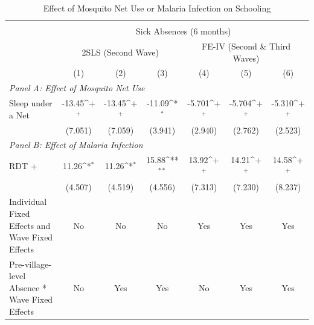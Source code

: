 \documentclass[fleqn,11pt]{article}
\newcommand{\sym}[1]{\rlap{$#1$}}
\def\sym#1{\ifmmode^{#1}\else\(^{#1}\)\fi
}
\begin{document}
\begin{table}[h]
\caption{Effect of Mosquito Net Use or Malaria Infection on Schooling}
\label{latemqnabsence62_child}\centering
\begin{adjustbox}{max width=\textwidth}
\begin{threeparttable}
\begin{tabular}{l*{6}{c}}
\hline\hline
                                                                \\
                                                                 &\multicolumn{6}{c}{Sick Absences (6 months)}\\  \cmidrule(lr){2-7}

                                       &\multicolumn{3}{c}{2SLS (Second Wave)}&\multicolumn{3}{c}{FE-IV (Second \& Third Waves)}\\  \cmidrule(lr){2-4}  \cmidrule(lr){5-7}
                    &\multicolumn{1}{c}{(1)}&\multicolumn{1}{c}{(2)}&\multicolumn{1}{c}{(3)}&\multicolumn{1}{c}{(4)}&\multicolumn{1}{c}{(5)}&\multicolumn{1}{c}{(6)}\\
                       \multicolumn{6}{l}{\textit{Panel A: Effect of Mosquito Net Use}}\\  \hline

Sleep under a Net      &      -13.45\sym{+}  &      -13.45\sym{+}  &      -11.09\sym{*}  &      -5.701\sym{+}  &      -5.704\sym{+}  &      -5.310\sym{+}  \\
                    &     (7.051)         &     (7.059)         &     (3.941)         &     (2.940)         &     (2.762)         &     (2.523)         \\
                       \multicolumn{6}{l}{\textit{Panel B: Effect of Malaria Infection}}\\  \hline

RDT +               &       11.26\sym{*}  &       11.26\sym{*}  &       15.88\sym{**} &       13.92\sym{+}  &       14.21\sym{+}  &       14.58\sym{+}  \\
                    &     (4.507)         &     (4.519)         &     (4.556)         &     (7.313)         &     (7.230)         &     (8.237)         \\

Individual Fixed Effects and Wave Fixed Effects &          No         &          No         &          No         &         Yes         &         Yes         &         Yes         \\

Pre-village-level Absence * Wave Fixed Effects&          No         &         Yes         &         Yes         &          No         &         Yes         &         Yes         \\


\end{tabular}
\end{threeparttable}
\end{adjustbox}
\end{table}
\end{document}
